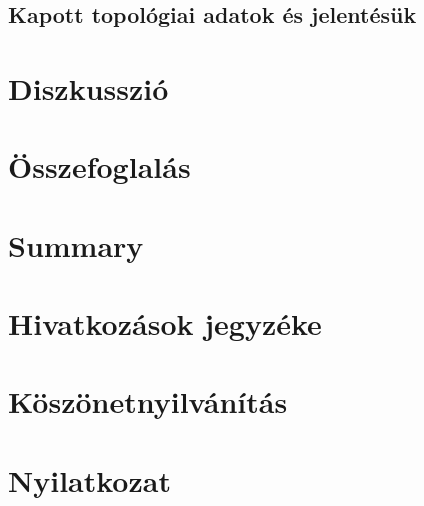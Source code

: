 \documentclass[a4paper,12pt]{article}
\begin{document}
	\subsection{Kapott topológiai adatok és jelentésük}
	
\section{Diszkusszió}
\section{Összefoglalás}
\section{Summary}
\section{Hivatkozások jegyzéke}
\section{Köszönetnyilvánítás}
\section{Nyilatkozat}

\pagebreak


{}

\end{document}
